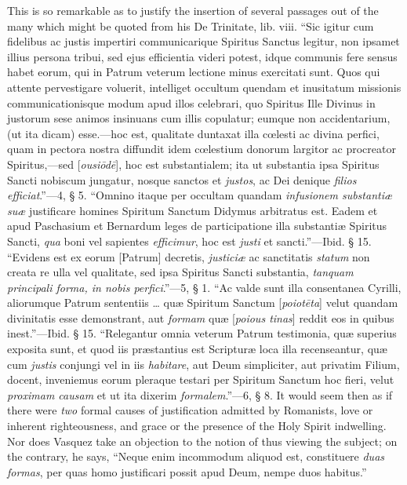 This is so remarkable as to justify the insertion of several
passages out of the many which might be quoted from his De Trinitate,
lib. viii. ``Sic igitur cum fidelibus ac justis impertiri
communicarique Spiritus Sanctus legitur, non ipsamet illius persona
tribui, sed ejus efficientia videri potest, idque communis fere sensus
habet eorum, qui in Patrum veterum lectione minus exercitati sunt.
Quos qui attente pervestigare voluerit, intelliget occultum quendam et
inusitatum missionis communicationisque modum apud illos celebrari,
quo Spiritus Ille Divinus in justorum sese animos insinuans cum illis
copulatur; eumque non accidentarium, (ut ita dicam) esse.—hoc est,
qualitate duntaxat illa cœlesti ac divina perfici, quam in pectora
nostra diffundit idem cœlestium donorum largitor ac procreator
Spiritus,—sed [\emph{ousi\={o}d\={e}}],
hoc est substantialem; ita ut substantia ipsa Spiritus Sancti nobiscum
jungatur, nosque sanctos et \emph{justos}, ac Dei denique \emph{filios}
\emph{efficiat}.''—4, § 5. ``Omnino itaque per occultam
quandam \emph{infusionem substantiæ suæ} justificare homines
Spiritum Sanctum Didymus arbitratus est. Eadem et apud Paschasium et
Bernardum leges de participatione illa substantiæ Spiritus Sancti, \emph{qua}
boni vel sapientes \emph{efficimur}, hoc est \emph{justi} et sancti.''—Ibid.
§ 15. ``Evidens est ex eorum [Patrum] decretis, \emph{justiciæ}
ac sanctitatis \emph{statum} non creata re ulla vel qualitate,
sed ipsa Spiritus Sancti substantia, \emph{tanquam principali forma, in
nobis perfici}.''—5, § 1. ``Ac valde sunt illa
consentanea Cyrilli, aliorumque Patrum sententiis … quæ Spiritum
Sanctum [\emph{poiot\={e}ta}] velut quandam divinitatis esse demonstrant, aut \emph{formam} quæ
[\emph{poious tinas}] reddit eos in quibus inest.''—Ibid. § 15. ``Relegantur
omnia veterum Patrum testimonia, quæ superius exposita sunt, et quod
iis præstantius est Scripturæ loca illa recenseantur, quæ cum \emph{justis}
conjungi vel in iis \emph{habitare}, aut Deum simpliciter, aut
privatim Filium, docent, inveniemus eorum pleraque testari per
Spiritum Sanctum hoc fieri, velut \emph{proximam causam} et ut ita
dixerim \emph{formalem}.''—6, § 8. It would seem then as if
there were \emph{two} formal causes of justification admitted by
Romanists, love or inherent righteousness, and grace or the presence
of the Holy Spirit indwelling. Nor does Vasquez take an objection to
the notion of thus viewing the subject; on the contrary, he says,
``Neque enim incommodum aliquod est, constituere \emph{duas} \emph{formas},
per quas homo justificari possit apud Deum, nempe duos habitus.''
